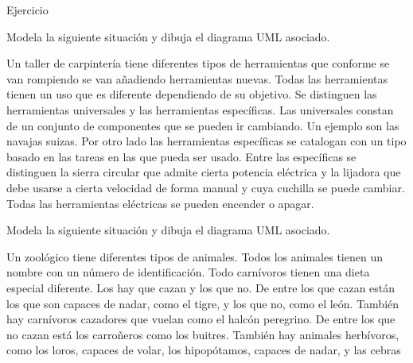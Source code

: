 \documentclass[10pt, envcountsect , spanish]{beamer}
\begin{document}
\begin{frame}{Ejercicio} 
\footnotesize



\begin{ejercicio}{} Modela la siguiente situación y dibuja el diagrama UML asociado.

Un taller de carpintería tiene diferentes tipos de herramientas que conforme se van rompiendo se van añadiendo herramientas nuevas. Todas las herramientas tienen un uso que es diferente dependiendo de su objetivo. Se distinguen las herramientas universales y las herramientas específicas. Las universales constan de un conjunto de componentes que se pueden ir cambiando. Un ejemplo son las navajas suizas. Por otro lado las herramientas específicas se catalogan con un tipo basado en las tareas en las que pueda ser usado. Entre las específicas se distinguen la sierra circular que admite cierta potencia eléctrica y la lijadora que debe usarse a cierta velocidad de forma manual y cuya cuchilla se puede cambiar. Todas las herramientas eléctricas se pueden encender o apagar. 


\end{ejercicio}



\begin{ejercicio}{} Modela la siguiente situación y dibuja el diagrama UML asociado.

Un zoológico tiene diferentes tipos de animales. Todos los animales tienen un nombre con un número de identificación. Todo carnívoros tienen una dieta especial diferente. Los hay que cazan y los que no. De entre los que cazan están los que son capaces de nadar, como el tigre, y los que no, como el león. También hay carnívoros cazadores que vuelan como el halcón peregrino. De entre los que no cazan está los carroñeros como los buitres.  También hay animales herbívoros, como los loros, capaces de volar, los hipopótamos, capaces de nadar, y las cebras



\end{ejercicio}

\end{frame}
\end{document}
